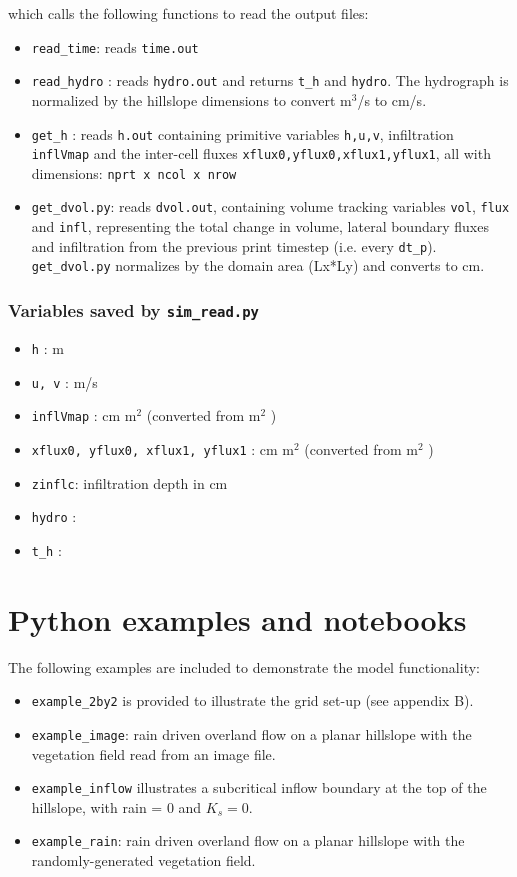 \documentclass{article}
\newcommand{\code}[1]{\texttt{#1}}
\begin{document}
which calls the following functions to read the output files:
\begin{itemize}
	\item \code{read\_time}: reads \code{time.out}
	\item \code{read\_hydro} : reads \code{hydro.out} and returns \code{t\_h} and \code{hydro}. The hydrograph is normalized by the hillslope dimensions to convert m$^3$/s to cm/s.
	\item \code{get\_h} : reads \code{h.out}  containing primitive variables \code{h,u,v}, infiltration  \code{inflVmap} and the inter-cell fluxes \code{xflux0,yflux0,xflux1,yflux1}, all with dimensions: \code{nprt x ncol x nrow}
	\item \code{get\_dvol.py}: reads \code{dvol.out}, containing volume tracking variables  \code{vol},  \code{flux} and  \code{infl}, representing the total change in volume, lateral boundary fluxes and infiltration from the previous print timestep (i.e. every \code{dt\_p}). \code{get\_dvol.py} normalizes by the domain area (Lx*Ly) and converts to cm. 
\end{itemize}

 
\subsubsection*{Variables saved by \code{sim\_read.py}}
\begin{itemize}
	\item \code{h} : m
	\item \code{u, v} : m/s
	\item \code{inflVmap} : cm m$^2$ (converted from m$^2$ )
	\item \code{xflux0, yflux0, xflux1, yflux1} : cm m$^2$ (converted from m$^2$ )	 
	\item  \code{zinflc}: infiltration depth in cm 
	\item  \code{hydro} :
	\item \code{t\_h} :    
\end{itemize}

	
\section{Python examples and notebooks}	


The following examples are included to demonstrate the model functionality:
\begin{itemize}
	\item \code{example\_2by2} is provided to illustrate the grid set-up (see appendix B).
	\item  \code{example\_image}: rain driven overland flow on a planar hillslope with the vegetation field read from an image file.
	\item \code{example\_inflow} illustrates a subcritical inflow boundary at the top of the hillslope, with rain = 0 and $K_s=0$.
	\item \code{example\_rain}:  rain driven overland flow on a planar hillslope with the randomly-generated vegetation field.
\end{itemize}
\end{document}
